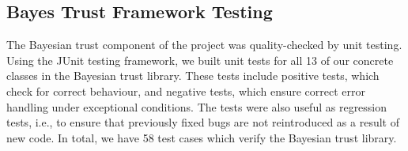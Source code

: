 \subsection{Bayes Trust Framework Testing}
The Bayesian trust component of the project was quality-checked by unit testing.
Using the JUnit testing framework, we built unit tests for all 13 of our concrete
classes in the Bayesian trust library. These tests include positive tests, which
check for correct behaviour, and negative tests, which ensure correct error
handling under exceptional conditions. The tests were also useful as regression
tests, i.e., to ensure that previously fixed bugs are not reintroduced as a
result of new code. In total, we have 58 test cases which verify the Bayesian
trust library.

